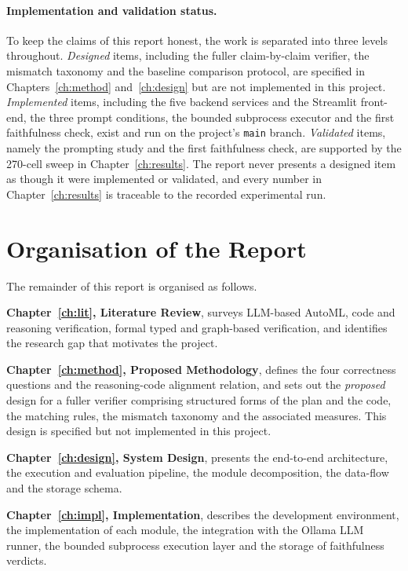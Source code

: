 \paragraph{Implementation and validation status.}
To keep the claims of this report honest, the work is separated into
three levels throughout. \emph{Designed} items, including the fuller
claim-by-claim verifier, the mismatch taxonomy and the baseline
comparison protocol, are specified in Chapters~\ref*{ch:method}
and~\ref*{ch:design} but are not implemented in this project.
\emph{Implemented} items, including the five backend services and the
Streamlit front-end, the three prompt conditions, the bounded
subprocess executor and the first faithfulness check, exist and run
on the
project's
\texttt{main} branch. \emph{Validated} items, namely the prompting study
and the first faithfulness check, are supported by the 270-cell
sweep in Chapter~\ref*{ch:results}. The report never presents a
designed item as though it were implemented or validated, and every
number in Chapter~\ref*{ch:results} is traceable to the recorded
experimental run.

\section{Organisation of the Report}

The remainder of this report is organised as follows.

\textbf{Chapter~\ref*{ch:lit}, Literature Review}, surveys
LLM-based AutoML, code and reasoning verification, formal typed
and graph-based verification, and identifies the research gap that
motivates the project.

\textbf{Chapter~\ref*{ch:method}, Proposed Methodology}, defines
the four correctness questions and the reasoning-code alignment
relation, and sets out the \emph{proposed} design for a fuller
verifier comprising structured forms of the plan and the code, the matching
rules, the mismatch taxonomy and the associated measures. This design is
specified but not implemented in this project.

\textbf{Chapter~\ref*{ch:design}, System Design}, presents the
end-to-end architecture, the execution and evaluation pipeline,
the module decomposition, the data-flow and the storage schema.

\textbf{Chapter~\ref*{ch:impl}, Implementation}, describes the
development environment, the implementation of each module, the
integration with the Ollama LLM runner, the bounded subprocess
execution layer and the storage of faithfulness verdicts.

